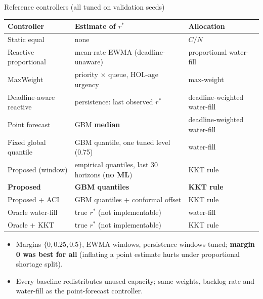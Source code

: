 \documentclass[aspectratio=169,11pt,xcolor=table]{beamer}
\newcommand{\rstar}{r^{\ast}}
\begin{document}
\begin{frame}{Reference controllers (all tuned on validation seeds)}
  \footnotesize
  \centering
  \begin{tabular}{lll}
    \toprule
    Controller & Estimate of $\rstar$ & Allocation \\
    \midrule
    Static equal & none & $C/N$ \\
    Reactive proportional & mean-rate EWMA (deadline-unaware) & proportional water-fill \\
    MaxWeight & priority $\times$ queue, HOL-age urgency & max-weight \\
    Deadline-aware reactive & persistence: last observed $\rstar$ & deadline-weighted water-fill \\
    Point forecast & GBM \textbf{median} & deadline-weighted water-fill \\
    Fixed global quantile & GBM quantile, one tuned level (0.75) & water-fill \\
    Proposed (window) & empirical quantiles, last 30 horizons (\textbf{no ML}) & KKT rule \\
    \textbf{Proposed} & \textbf{GBM quantiles} & \textbf{KKT rule} \\
    Proposed + ACI & GBM quantiles + conformal offset & KKT rule \\
    Oracle water-fill & true $\rstar$ (not implementable) & water-fill \\
    Oracle + KKT & true $\rstar$ (not implementable) & KKT rule \\
    \bottomrule
  \end{tabular}
  \vspace{0.2em}
  \begin{itemize}
    \item Margins $\{0, 0.25, 0.5\}$, EWMA windows, persistence windows tuned; \textbf{margin 0 was best for all} (inflating a point estimate hurts under proportional shortage split).
    \item Every baseline redistributes unused capacity; same weights, backlog rate and water-fill as the point-forecast controller.
  \end{itemize}
\end{frame}
\end{document}
